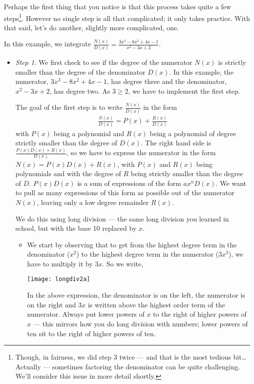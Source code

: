 Perhaps the first thing that you notice is that this process takes quite a few
steps\footnote{Though, in fairness, we did step 3 twice --- and that is the most
tedious bit\dots Actually --- sometimes factoring the denominator can be quite
challenging. We'll consider this issue in more detail shortly.}. However no single step
is all that complicated; it only takes practice. With that said, let's do another,
slightly more complicated, one.
\begin{eg}\label{eg:PFb}
In this example, we integrate $\frac{N(x)}{D(x)}
=\frac{3x^3-8x^2+4x-1}{x^2-3x+2}$.

\soln
\begin{itemize}
 \item \emph{Step 1.}
We first check to see if the degree of the numerator $N(x)$ is
strictly smaller than the degree of the denominator $D(x)$. In this
example, the numerator, $3x^3-8x^2+4x-1$, has degree three and the
denominator, $x^2-3x+2$, has degree two. As $3\ge 2$, we have to implement
the first step.

The goal of the first step is to write $\frac{N(x)}{D(x)}$
in the form
\begin{align*}
\frac{N(x)}{D(x)}=P(x)+\frac{R(x)}{D(x)}
\end{align*}
with $P(x)$ being a polynomial and $R(x)$ being a polynomial of degree
strictly smaller than the degree of $D(x)$. The right hand side is
$\frac{P(x)D(x)+R(x)}{D(x)}$, so we have to express the numerator
in the form $N(x)=P(x)D(x)+R(x)$, with $P(x)$ and $R(x)$ being polynomials
and with the degree of $R$ being strictly smaller than the degree of $D$.
$P(x)D(x)$ is a sum of expressions of the form $ax^n D(x)$. We want to
pull as many expressions of this form as possible out of the numerator
$N(x)$, leaving only a low degree remainder $R(x)$.

We do this using long division --- the same long division you learned in school, but with
the base 10 replaced by $x$.
\begin{itemize}
 \item We start by observing that to get from the highest degree
term in the denominator ($x^2$) to the highest degree term in the numerator ($3x^3$), we
have to multiply it by $3x$. So we write,
\begin{center}
\texttt{[image: longdiv2a]}
\end{center}
In the above expression, the denominator is on the left, the numerator is on the right
and $3x$ is written above the highest order term of the numerator. Always put lower
powers of $x$ to the right of higher powers of $x$ --- this mirrors how you do long
division with numbers; lower powers of ten sit to the right of higher powers of ten.


\end{itemize}
\end{itemize}
\end{eg}
